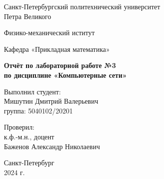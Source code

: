 \begin{titlepage}
  \begin{center}
    {\large Санкт-Петербургский политехнический университет\\Петра Великого\\}
  \end{center}

  \begin{center}
    {\large Физико-механический иститут}
  \end{center}


  \begin{center}
    {\large Кафедра «Прикладная математика»}
  \end{center}

  \vspace{8em}

  \begin{center}
    {\bfseries Отчёт по лабораторной работе №3 \\по дисциплине «Компьютерные сети»}
  \end{center}

  \vspace{5em}

  \begin{flushleft}
    \hspace{16em}Выполнил студент:\\\hspace{16em}Мишутин Дмитрий Валерьевич\\\hspace{16em}группа: 5040102/20201

    \vspace{2em}

    \hspace{16em}Проверил:\\\hspace{16em}к.ф.-м.н., доцент\\\hspace{16em}Баженов Александр Николаевич

  \end{flushleft}


  \vspace{6em}


  \begin{center}
    Санкт-Петербург\\2024 г.
  \end{center}

\end{titlepage}

